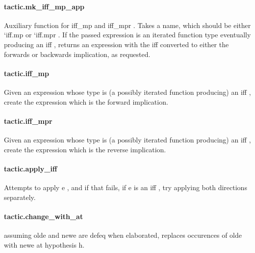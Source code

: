 \documentclass{article}
\begin{document}
\paragraph{tactic.mk\_iff\_mp\_app}
\par
Auxiliary function for 
\colorbox[RGB]{253,246,227}{{{{\color[RGB]{101, 123, 131} iff\_mp }}}} and 
\colorbox[RGB]{253,246,227}{{{{\color[RGB]{101, 123, 131} iff\_mpr }}}}. Takes a name, which should be either 
\colorbox[RGB]{253,246,227}{{{{\color[RGB]{101, 123, 131}  `iff.mp }}}}or 
\colorbox[RGB]{253,246,227}{{{{\color[RGB]{101, 123, 131}  `iff.mpr }}}}. If the passed expression is an iterated function type eventually producing an
\colorbox[RGB]{253,246,227}{{{{\color[RGB]{101, 123, 131} iff }}}}, returns an expression with the 
\colorbox[RGB]{253,246,227}{{{{\color[RGB]{101, 123, 131} iff }}}} converted to either the forwards or backwards
implication, as requested.
\paragraph{tactic.iff\_mp}
\par
Given an expression whose type is (a possibly iterated function producing) an 
\colorbox[RGB]{253,246,227}{{{{\color[RGB]{101, 123, 131} iff }}}},
create the expression which is the forward implication.
\paragraph{tactic.iff\_mpr}
\par
Given an expression whose type is (a possibly iterated function producing) an 
\colorbox[RGB]{253,246,227}{{{{\color[RGB]{101, 123, 131} iff }}}},
create the expression which is the reverse implication.
\paragraph{tactic.apply\_iff}
\par
Attempts to apply 
\colorbox[RGB]{253,246,227}{{{{\color[RGB]{101, 123, 131} e }}}}, and if that fails, if 
\colorbox[RGB]{253,246,227}{{{{\color[RGB]{101, 123, 131} e }}}} is an 
\colorbox[RGB]{253,246,227}{{{{\color[RGB]{101, 123, 131} iff }}}},
try applying both directions separately.
\paragraph{tactic.change\_with\_at}
\par
assuming olde and newe are defeq when elaborated, replaces occurences of olde with newe at hypothesis h.
\end{document}

